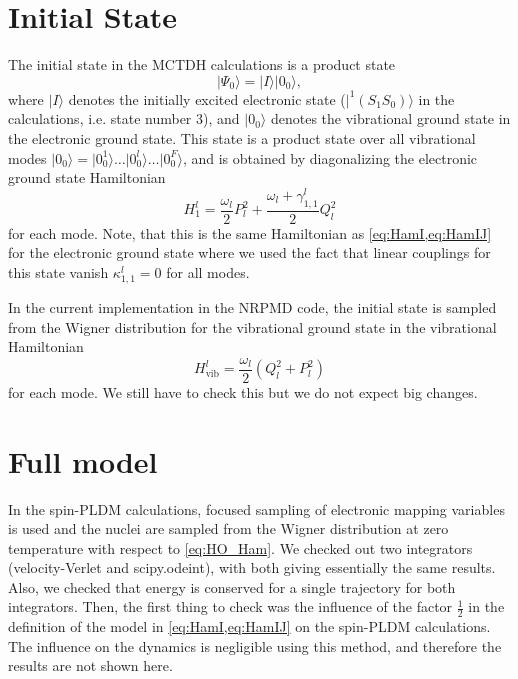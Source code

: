 \documentclass{article}
\begin{document}
\section{Initial State}
The initial state in the MCTDH calculations is a product state 
\begin{equation}
	\vert \Psi_0\rangle = \vert I\rangle \vert 0_0\rangle,
\end{equation}
where $\vert I\rangle$ denotes the initially excited electronic state ($\vert ^1(S_1S_0)\rangle$ in the calculations, i.e. state number 3), and $\vert 0_0 \rangle$ denotes the vibrational ground state in the electronic ground state. This state is a product state over all vibrational modes $\vert 0_0\rangle =\vert 0_0^1\rangle \dots \vert 0_0^l\rangle\dots \vert 0_0^F\rangle$, and is obtained by diagonalizing the electronic ground state Hamiltonian
\begin{equation}
	H_{1}^l =  \frac{\omega_l}{2} P_l^2 + \frac{\omega_l+\gamma_{1,1}^l}{2}Q_l^2 \label{eq:InitialHam}
\end{equation}  
for each mode.
Note, that this is the same Hamiltonian as \cref{eq:HamI,eq:HamIJ} for the electronic ground state where we used the fact that linear couplings for this state vanish $\kappa_{1,1}^l=0$ for all modes.  

In the current implementation in the NRPMD code, the initial state is sampled from the Wigner distribution for the vibrational ground state in the vibrational Hamiltonian
\begin{equation}
	H_\mathrm{vib}^{l} = \frac{\omega_l}{2}\left(Q_l^2 + P_l^2\right)\label{eq:HO_Ham}
\end{equation}
for each mode. We still have to check this but we do not expect big changes.
\section{Full model}
In the spin-PLDM calculations, focused sampling of electronic mapping variables is used and the nuclei are sampled from the Wigner distribution at zero temperature with respect to \cref{eq:HO_Ham}. We checked out two integrators (velocity-Verlet and scipy.odeint), with both giving essentially the same results. Also, we checked that energy is conserved for a single trajectory for both integrators.  
Then, the first thing to check was the influence of the factor $\frac{1}{2}$ in the definition of the model in \cref{eq:HamI,eq:HamIJ} on the spin-PLDM calculations. The influence on the dynamics is negligible using this method, and therefore the results are not shown here. 
\end{document}
